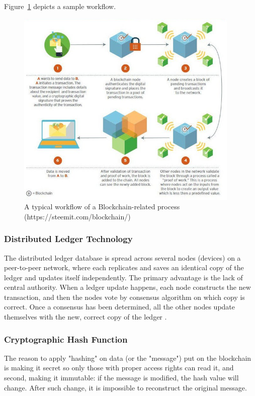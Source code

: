 \documentclass[a4paper]{article}
\begin{document}
Figure~\ref{fig:BC_Workflow} depicts a sample workflow.
\begin{figure}[H]
    \centering
    \includegraphics[width=0.95\textwidth]{figures/sample_BC_flow.png}
    \caption{A typical workflow of a Blockchain-related process (https://steemit.com/blockchain/)}
    \label{fig:BC_Workflow}
\end{figure}

\subsubsection{Distributed Ledger Technology}
The distributed ledger database is spread across several nodes (devices) on a peer-to-peer network, where each replicates and saves an identical copy of the ledger and updates itself independently. The primary advantage is the lack of central authority. When a ledger update happens, each node constructs the new transaction, and then the nodes vote by consensus algorithm on which copy is correct. Once a consensus has been determined, all the other nodes update themselves with the new, correct copy of the ledger \cite{DLT}.


\subsubsection{Cryptographic Hash Function}
The reason to apply "hashing" on data (or the "message") put on the blockchain is making it secret so only those with proper access rights can read it, and second, making it immutable: if the message is modified, the hash value will change. After such change, it is impossible to reconstruct the original message.
\end{document}
